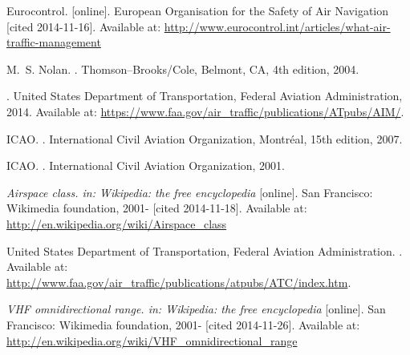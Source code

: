 \begin{thebibliography}{1}

Eurocontrol.
 [online].
\newblock European Organisation for the Safety of Air Navigation [cited 2014-11-16].
\newblock Available at: \url{http://www.eurocontrol.int/articles/what-air-traffic-management}

M.~S. Nolan.
.
\newblock Thomson--Brooks/Cole, Belmont, CA, 4th edition, 2004.

.
\newblock United States Department of Transportation, Federal Aviation Administration, 2014.
\newblock Available at: \url{https://www.faa.gov/air_traffic/publications/ATpubs/AIM/}.

ICAO.
.
\newblock International Civil Aviation Organization, Montréal, 15th edition, 2007.

ICAO.
.
\newblock International Civil Aviation Organization, 2001.

{\em Airspace class. in: Wikipedia: the free encyclopedia} [online].
\newblock San Francisco: Wikimedia foundation, 2001- [cited 2014-11-18].
\newblock Available at: \url{http://en.wikipedia.org/wiki/Airspace_class}

United States Department of Transportation, Federal Aviation Administration.
.
\newblock Available at: \url{http://www.faa.gov/air_traffic/publications/atpubs/ATC/index.htm}.

{\em VHF omnidirectional range. in: Wikipedia: the free encyclopedia} [online].
\newblock San Francisco: Wikimedia foundation, 2001- [cited 2014-11-26].
\newblock Available at: \url{http://en.wikipedia.org/wiki/VHF_omnidirectional_range}









\end{thebibliography}
